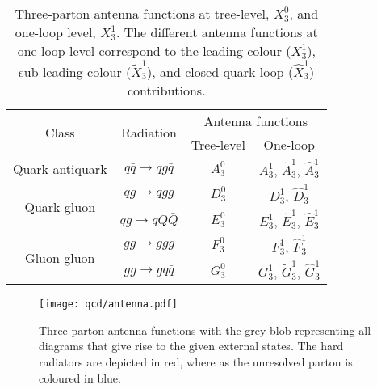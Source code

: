 \documentclass[main.tex]{subfiles}
\begin{document}
    \begin{table}[ht]
        \begin{tabular}{ cccc } 
            \toprule
            \multirow{2}[3]{*}{Class} & \multirow{2}[3]{*}{Radiation} & \multicolumn{2}{c}{Antenna functions} \\
            \cmidrule(lr){3-4}
             & & Tree-level & One-loop \\
            \midrule
            Quark-antiquark & $q \bar{q} \rightarrow q g \bar{q}$& $A_{3}^{0}$ & $A_{3}^{1}$, $\tilde{A}_{3}^{1}$, $\hat{A}_{3}^{1}$ \\
            \midrule
            \multirow{2}{*}{Quark-gluon} & $q g \rightarrow q g g$ & $D_{3}^{0}$ & $D_{3}^{1}$, $\hat{D}_{3}^{1}$ \\
            \cmidrule(lr){2-4}
             & $qg \rightarrow q Q \bar{Q}$ & $E_{3}^{0}$ & $E_{3}^{1}$, $\tilde{E}_{3}^{1}$, $\hat{E}_{3}^{1}$ \\
            \midrule
            \multirow{2}{*}{Gluon-gluon} & $g g \rightarrow g g g$ & $F_{3}^{0}$ & $F_{3}^{1}$, $\hat{F}_{3}^{1}$ \\
            \cmidrule(lr){2-4}
            & $g g \rightarrow g q \bar{q}$ & $G_{3}^{0}$ & $G_{3}^{1}$, $\tilde{G}_{3}^{1}$, $\hat{G}_{3}^{1}$ \\
            \bottomrule
        \end{tabular}
        \caption{Three-parton antenna functions at tree-level, $X_{3}^{0}$,
        and one-loop level, $X_{3}^{1}$. The different antenna functions at
        one-loop level correspond to the leading colour ($X_{3}^{1}$),
        sub-leading colour ($\tilde{X}_{3}^{1}$), and closed quark loop
        ($\hat{X}_{3}^{1}$) contributions.}
        \label{table:antenna_functions}
    \end{table}

    \begin{figure}
        \texttt{[image: qcd/antenna.pdf]}
        \caption{Three-parton antenna functions with the grey
        blob representing all diagrams that give rise to the given
        external states. The hard radiators are depicted in red,
        where as the unresolved parton is coloured in blue.}
        \label{fig:antenna}
    \end{figure}
\end{document}
